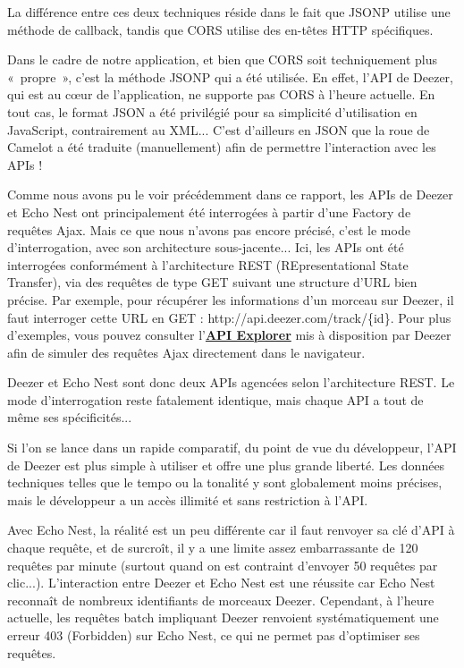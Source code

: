 \documentclass[a4paper,12pt]{article}
\begin{document}
La différence entre ces deux techniques réside dans le fait que JSONP utilise une méthode de callback, tandis que CORS utilise des en-têtes HTTP spécifiques.

Dans le cadre de notre application, et bien que CORS soit techniquement plus «~propre~», c'est la méthode JSONP qui a été utilisée. En effet, l'API de Deezer, qui est au cœur de l'application, ne supporte pas CORS à l'heure actuelle. En tout cas, le format JSON a été privilégié pour sa simplicité d'utilisation en JavaScript, contrairement au XML... C'est d'ailleurs en JSON que la roue de Camelot a été traduite (manuellement) afin de permettre l'interaction avec les APIs !

Comme nous avons pu le voir précédemment dans ce rapport, les APIs de Deezer et Echo Nest ont principalement été interrogées à partir d'une Factory de requêtes Ajax. Mais ce que nous n'avons pas encore précisé, c'est le mode d'interrogation, avec son architecture sous-jacente... Ici, les APIs ont été interrogées conformément à l'architecture REST (REpresentational State Transfer), via des requêtes de type GET suivant une structure d'URL bien précise. Par exemple, pour récupérer les informations d'un morceau sur Deezer, il faut interroger cette URL en GET : http://api.deezer.com/track/\{id\}. Pour plus d'exemples, vous pouvez consulter l'\href{https://developers.deezer.com/api/explorer}{\textbf{API Explorer}} mis à disposition par Deezer afin de simuler des requêtes Ajax directement dans le navigateur.

Deezer et Echo Nest sont donc deux APIs agencées selon l'architecture REST. Le mode d'interrogation reste fatalement identique, mais chaque API a tout de même ses spécificités...

Si l'on se lance dans un rapide comparatif, du point de vue du développeur, l'API de Deezer est plus simple à utiliser et offre une plus grande liberté. Les données techniques telles que le tempo ou la tonalité y sont globalement moins précises, mais le développeur a un accès illimité et sans restriction à l'API.

Avec Echo Nest, la réalité est un peu différente car il faut renvoyer sa clé d'API à chaque requête, et de surcroît, il y a une limite assez embarrassante de 120 requêtes par minute (surtout quand on est contraint d'envoyer 50 requêtes par clic...). L'interaction entre Deezer et Echo Nest est une réussite car Echo Nest reconnaît de nombreux identifiants de morceaux Deezer. Cependant, à l'heure actuelle, les requêtes batch impliquant Deezer renvoient systématiquement une erreur 403 (Forbidden) sur Echo Nest, ce qui ne permet pas d'optimiser ses requêtes.
\end{document}

